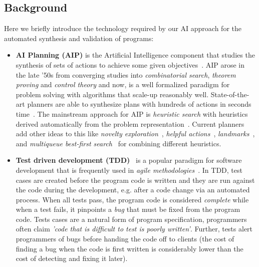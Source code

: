 \documentclass[10pt,a4paper]{paper}
\begin{document}
\subsection{Background}
Here we briefly introduce the technology required by our AI approach for the automated synthesis and validation of programs:
\begin{itemize}
\item {\bf AI Planning (AIP)} is the Artificial Intelligence component that studies the synthesis of sets of actions to achieve some given objectives~\cite{ghallab2004automated}. AIP arose in the late ’50s from converging studies into {\em combinatorial search}, {\em theorem proving} and {\em control theory} and now, is a well formalized paradigm for problem solving with algorithms that scale-up reasonably well. State-of-the-art planners are able to synthesize plans with hundreds of actions in seconds time~\cite{geffner2013concise}.  The mainstream approach for AIP is {\em heuristic search} with heuristics derived automatically from the problem representation~\cite{mcdermott1996heuristic,bonet2001planning}.  Current planners add other ideas to this like {\it novelty exploration}~\cite{geffner:psimulators:IJCAI17}, {\it helpful actions}~\cite{hoffmann2001ff}, {\it landmarks}~\cite{helmert2006fast}, and {\it multiqueue best-first search}~\cite{richter2010lama} for combining different heuristics.
  
\item {\bf Test driven development (TDD)}~\cite{beck:TDD:2003} is a popular paradigm for software development that is frequently used in {\it agile methodologies}~\cite{cohen2003agile}. In TDD, test cases are created before the program code is written and they are run against the code during the development, e.g. after a code change via an automated process. When all tests pass, the program code is considered {\em complete} while when a test fails, it pinpoints a {\em bug} that must be fixed from the program code. Tests cases are a natural form of program specification, programmers often claim {\em 'code that is difficult to test is poorly written'}. Further, tests alert programmers of bugs before handing the code off to clients (the cost of finding a bug when the code is first written is considerably lower than the cost of detecting and fixing it later). %
\end{itemize}
\end{document}
